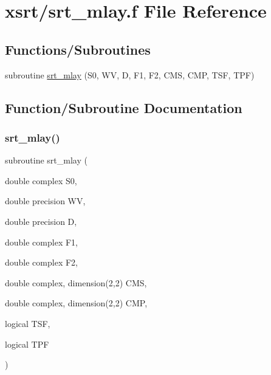 \hypertarget{xsrt_2srt__mlay_8f}{}\section{xsrt/srt\+\_\+mlay.f File Reference}
\label{xsrt_2srt__mlay_8f}
\subsection*{Functions/\+Subroutines}
\begin{DoxyCompactItemize}
\item 
subroutine \hyperlink{xsrt_2srt__mlay_8f_ac1f780c78dc47c36f66b47b0ea9c140f}{srt\+\_\+mlay} (S0, WV, D, F1, F2, C\+MS, C\+MP, T\+SF, T\+PF)
\end{DoxyCompactItemize}


\subsection{Function/\+Subroutine Documentation}
\mbox{\label{xsrt_2srt__mlay_8f_ac1f780c78dc47c36f66b47b0ea9c140f}} 
\subsubsection{\texorpdfstring{srt\+\_\+mlay()}{srt\_mlay()}}
{\footnotesize\ttfamily subroutine srt\+\_\+mlay (\begin{DoxyParamCaption}\item[{double complex}]{S0,  }\item[{double precision}]{WV,  }\item[{double precision}]{D,  }\item[{double complex}]{F1,  }\item[{double complex}]{F2,  }\item[{double complex, dimension(2,2)}]{C\+MS,  }\item[{double complex, dimension(2,2)}]{C\+MP,  }\item[{logical}]{T\+SF,  }\item[{logical}]{T\+PF }\end{DoxyParamCaption})}


